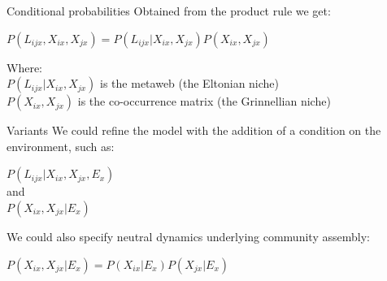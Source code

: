 \documentclass{eecslides}
\begin{document}

	\begin{frame}{Conditional probabilities}
	Obtained from the product rule we get:
		\begin{center}
			$P(L_{ijx},X_{ix},X_{jx}) = P(L_{ijx}|X_{ix},X_{jx})P(X_{ix},X_{jx})$
		\end{center}
	Where:\\
	$P(L_{ijx}|X_{ix},X_{jx})$ is the metaweb (the Eltonian niche)\\
 	$P(X_{ix},X_{jx})$ is the co-occurrence matrix (the Grinnellian niche)
		
	\end{frame}


	\begin{frame}{Variants}
	 We could refine the model with the addition of a condition on the environment, such as:
		\begin{center}
			$P(L_{ijx}|X_{ix},X_{jx},E_x)$\\
			and\\
			$P(X_{ix},X_{jx}|E_x)$
		\end{center}   
	We could also specify neutral dynamics underlying community assembly:
 		\begin{center}
			$P(X_{ix},X_{jx}|E_x) =P(X_{ix}|E_x)P(X_{jx}|E_x)$
		\end{center}   
	\end{frame}

\end{document}
